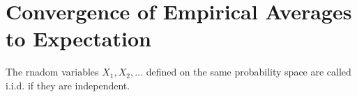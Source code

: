 \section{Convergence of Empirical Averages to Expectation}

\begin{definition*}
  The rnadom variables \(X_1, X_2, \ldots\) defined on the same probability space are called i.i.d. if they are independent.
\end{definition*}
